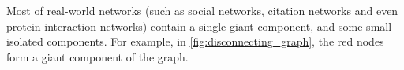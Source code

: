 

Most of real-world networks (such as social networks, citation networks and even protein interaction networks) contain a single giant component, and some small isolated components.
For example, in \autoref{fig:disconnecting_graph}, the red nodes form a giant component of the graph.


%
%
%
%
%

